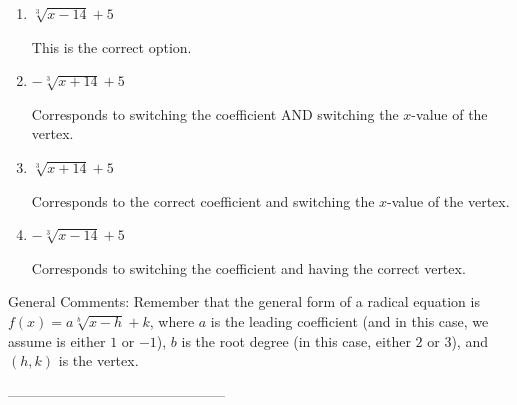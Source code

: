 \documentclass{article}[10pt]
\begin{document}
\begin{enumerate}[label=\Alph*.] 
\item $ \sqrt[3]{x - 14} + 5 $ 

 This is the correct option. 
\item $ - \sqrt[3]{x + 14} + 5 $ 

 Corresponds to switching the coefficient AND switching the $x$-value of the vertex. 
\item $ \sqrt[3]{x + 14} + 5 $ 

 Corresponds to the correct coefficient and switching the $x$-value of the vertex. 
\item $ - \sqrt[3]{x - 14} + 5 $ 

 Corresponds to switching the coefficient and having the correct vertex. 
\end{enumerate} 
 
General Comments: Remember that the general form of a radical equation is $ f(x) = a \sqrt[b]{x - h} + k$, where $a$ is the leading coefficient (and in this case, we assume is either $1$ or $-1$), $b$ is the root degree (in this case, either $2$ or $3$), and $(h, k)$ is the vertex.

-----------------------------------------------
\end{document}
